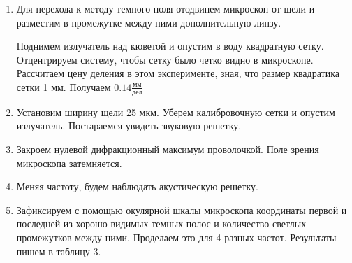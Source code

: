 \documentclass[12pt,a4paper]{article}
\begin{document}
	\begin{enumerate}
		\item Для перехода к методу темного поля отодвинем микроскоп от щели и разместим в промежутке между ними дополнительную линзу.
		
		Поднимем излучатель над кюветой и опустим в воду квадратную сетку. Отцентрируем систему, чтобы сетку было четко видно в микроскопе. Рассчитаем цену деления в этом эксперименте, зная, что размер квадратика сетки 1 мм. Получаем $\boxed{0.14 \frac{\text{мм}}{\text{дел}}}$
		
		
		\item Установим ширину щели 25 мкм. Уберем калибровочную сетки и опустим излучатель. Постараемся увидеть звуковую решетку.
		
		\item Закроем нулевой дифракционный максимум проволочкой. Поле зрения микроскопа затемняется.
		
		\item Меняя частоту, будем наблюдать акустическую решетку.
		
		\item Зафиксируем с помощью окулярной шкалы микроскопа координаты первой и последней из хорошо видимых темных полос и количество светлых промежутков между ними. Проделаем это для 4 разных частот. Результаты пишем в таблицу 3.
		

\end{enumerate}
\end{document}
